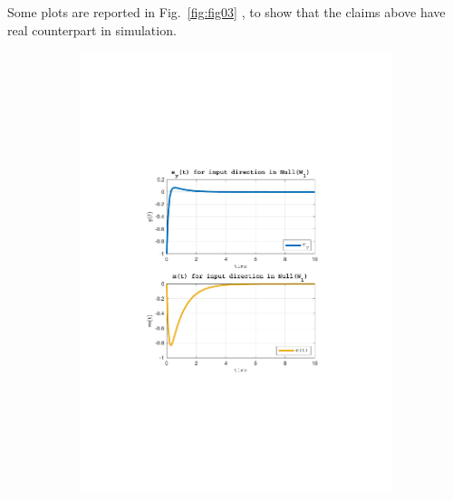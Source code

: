 \documentclass[a4paper, 12pt]{article}
\begin{document}
Some plots are reported in Fig.~\ref{fig:fig03}  , to show that the claims above have real counterpart in simulation.
\begin{figure}[h!]{}
    \begin{subfigure}[t]{0.32\textwidth}
           \includegraphics[width=\textwidth]{Figures/fig03a.pdf}
           \label{fig:fig03a}
    \end{subfigure}
    \begin{subfigure}[t]{0.32\textwidth}

\end{subfigure}
\end{figure}
\end{document}
